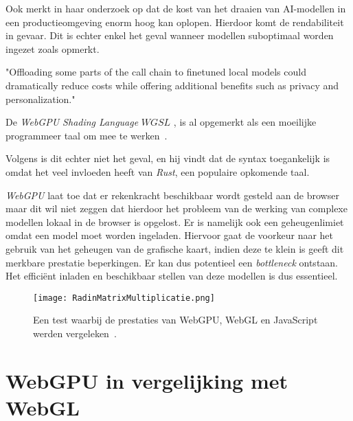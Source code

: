\bigbreak{}

Ook \textcite{Huyen2023} merkt in haar onderzoek op dat de kost van het draaien van AI-modellen in een productieomgeving enorm hoog kan oplopen. Hierdoor komt de rendabiliteit in gevaar. Dit is echter enkel het geval wanneer modellen suboptimaal worden ingezet zoals \textcite{Fleetwood2023a} opmerkt.

\begin{displayquote}
    "Offloading some parts of the call chain to finetuned local models could dramatically reduce costs while offering additional benefits such as privacy and personalization."
\end{displayquote}

\bigbreak{}

De \textit{WebGPU Shading Language} \(\textit{WGSL}\) \autocite{W3C2024}, is al opgemerkt als een moeilijke programmeer taal om mee te werken~\autocite{Madrigal2023, Ashton2020}.

Volgens \textcite{Fleetwood2023a} is dit echter niet het geval, en hij vindt dat de syntax toegankelijk is omdat het veel invloeden heeft van \textit{Rust}, een populaire opkomende taal.

\bigbreak{}

\textit{WebGPU} laat toe dat er rekenkracht beschikbaar wordt gesteld aan de browser maar dit wil niet zeggen dat hierdoor het probleem van de werking van complexe modellen lokaal in de browser is opgelost. Er is namelijk ook een geheugenlimiet omdat een model moet worden ingeladen. Hiervoor gaat de voorkeur naar het gebruik van het geheugen van de grafische kaart, indien deze te klein is geeft dit merkbare prestatie beperkingen. Er kan dus potentieel een \textit{bottleneck} ontstaan. Het efficiënt inladen en beschikbaar stellen van deze modellen is dus essentieel.

\break{}

\begin{figure}
    \texttt{[image: RadinMatrixMultiplicatie.png]}
    \caption[Matrixvermenigvuldiging test~\autocite{Radin2021}]{Een test waarbij de prestaties van WebGPU, WebGL en JavaScript werden vergeleken~\autocite{Radin2021}.}
    \label{fig:Matrix Multiplication By Radin}
\end{figure}

\section{WebGPU in vergelijking met WebGL}

